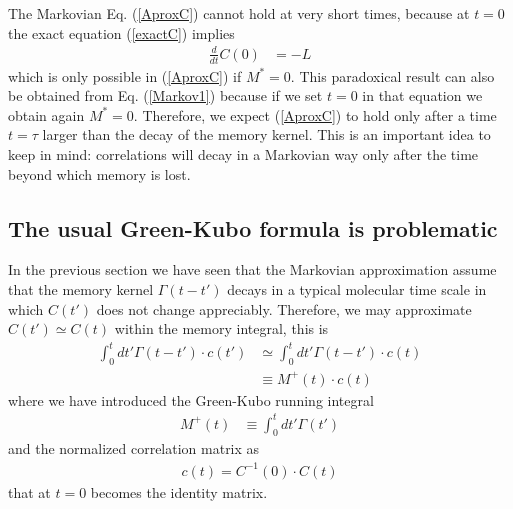 \documentclass[b5paper,openright,11pt]{book}
\newcommand{\esc}{\!\cdot\!}
\begin{document}
The Markovian Eq.  (\ref{AproxC})  cannot hold at
very short times,  because at $t=0$ the  exact equation (\ref{exactC})
implies
\begin{align}
    \frac{d}{dt}C(0)&=-L
\end{align}
which is only possible in  (\ref{AproxC}) if $M^*=0$. This paradoxical
result can  also be obtained  from Eq.  (\ref{Markov1}) because  if we
set $t=0$  in that  equation we obtain  again $M^*=0$.   Therefore, we
expect (\ref{AproxC}) to  hold  only after a time
$t=\tau$  larger than  the  decay of  the memory  kernel.  This is  an
important idea to keep in mind: correlations will decay in a Markovian
way only  after the time  beyond which memory  is lost. 

\subsection{The usual Green-Kubo formula is problematic}
In the previous section we have seen that the Markovian approximation assume that the memory kernel $\Gamma(t-t')$ decays in a typical molecular time scale in which $C(t')$ does not change appreciably. Therefore, we may approximate $C(t')\simeq C(t)$ within the memory integral, this is
\begin{align}
  \int_0^tdt' \Gamma(t-t')\esc c(t')&\simeq  \int_0^tdt' \Gamma(t-t')\esc  c(t)
\nonumber\\
&\equiv
M^+(t)\esc c(t)
\end{align}
where we have introduced the Green-Kubo running integral
\begin{align}
M^+(t)&\equiv  \int_0^tdt' \Gamma(t') 
\label{Mt}
\end{align}
and the normalized correlation matrix as
\begin{align}
  c(t)=C^{-1}(0)\esc C(t)
\end{align}
that at $t=0$ becomes the identity matrix.
\end{document}
